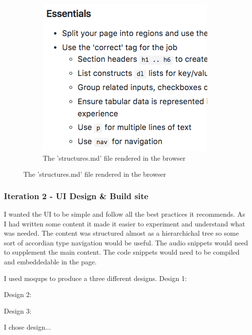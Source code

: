 \begin{figure}[H]
    \begin{subfigure}[b]{0.4\textwidth}
        \includegraphics[width=\textwidth]{figures/documentation_md_example_2}
        \captionsetup{justification=centering}
        \caption{The 'structures.md' file rendered in the browser}
        \label{fig:structures}
    \end{subfigure}
\end{figure}

\subsubsection{Iteration 2 - UI Design \& Build site}
I wanted the UI to be simple and follow all the best practices it recommends.
As I had written some content it made it easier to experiment and understand
what was needed. The content was structured almost as a hierarchichal tree so
some sort of accordian type navigation would be useful. The audio snippets
would need to supplement the main content. The code snippets
would need to be compiled and embeddedable in the page.

I used moqups to produce a three different designs.
Design 1:

Design 2:

Design 3:

I chose design...

